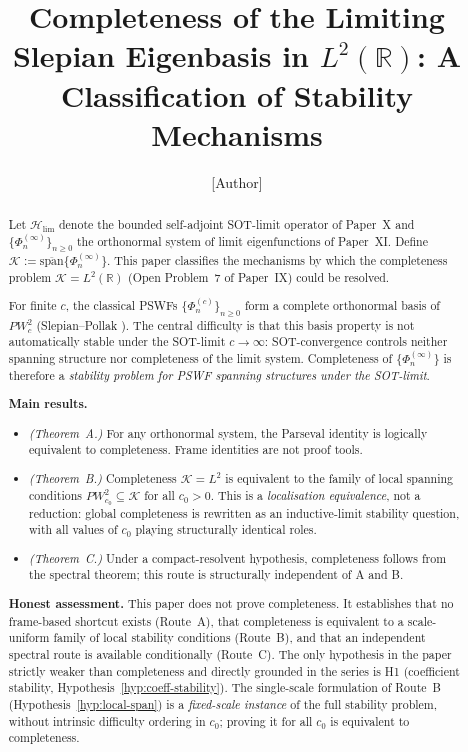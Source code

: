 \documentclass[12pt,a4paper]{amsart}
\theoremstyle{definition}
\theoremstyle{remark}
\newcommand{\Hlim}{\mathcal{H}_{\lim}}
\newcommand{\Phiinf}[1]{\Phi_{#1}^{(\infty)}}
\newcommand{\Phic}[2]{\Phi_{#2}^{(#1)}}
\newcommand{\PW}{PW}
\newcommand{\Kspace}{\mathcal{K}}
\begin{document}
\title[Completeness of the Limiting Slepian Eigenbasis]{%
  Completeness of the Limiting Slepian Eigenbasis in $L^2(\mathbb{R})$:
  A Classification of Stability Mechanisms}

\author{[Author]}
\address{[Address]}
\email{[Email]}

\begin{abstract}
Let $\Hlim$ denote the bounded self-adjoint SOT-limit operator
of Paper~X and $\{\Phiinf{n}\}_{n \ge 0}$ the orthonormal
system of limit eigenfunctions of Paper~XI.
Define $\Kspace := \overline{\mathrm{span}}\{\Phiinf{n}\}$.
This paper classifies the mechanisms by which the completeness
problem $\Kspace = L^2(\mathbb{R})$ (Open Problem~7 of Paper~IX)
could be resolved.

\medskip
For finite $c$, the classical PSWFs $\{\Phic{c}{n}\}_{n \ge 0}$
form a complete orthonormal basis of $\PW_c^2$ (Slepian--Pollak
\cite{Slepian1961}).
The central difficulty is that this basis property is not
automatically stable under the SOT-limit $c \to \infty$:
SOT-convergence controls neither spanning structure nor
completeness of the limit system.
Completeness of $\{\Phiinf{n}\}$ is therefore a
\emph{stability problem for PSWF spanning structures under
the SOT-limit}.

\medskip
\textbf{Main results.}
\begin{itemize}
\item \emph{(Theorem~A.)} For any orthonormal system,
  the Parseval identity is logically equivalent to completeness.
  Frame identities are not proof tools.
\item \emph{(Theorem~B.)} Completeness $\Kspace=L^2$ is equivalent
  to the family of local spanning conditions
  $\PW_{c_0}^2 \subseteq \Kspace$ for all $c_0>0$.
  This is a \emph{localisation equivalence}, not a reduction:
  global completeness is rewritten as an
  inductive-limit stability question, with all
  values of $c_0$ playing structurally identical roles.
\item \emph{(Theorem~C.)} Under a compact-resolvent
  hypothesis, completeness follows from the spectral theorem;
  this route is structurally independent of A and B.
\end{itemize}

\medskip
\textbf{Honest assessment.}
This paper does not prove completeness.
It establishes that no frame-based shortcut exists (Route~A),
that completeness is equivalent to a scale-uniform
family of local stability conditions (Route~B),
and that an independent spectral route is available
conditionally (Route~C).
The only hypothesis in the paper strictly weaker than
completeness and directly grounded in the series
is H1 (coefficient stability,
Hypothesis~\ref{hyp:coeff-stability}).
The single-scale formulation of Route~B
(Hypothesis~\ref{hyp:local-span}) is a
\emph{fixed-scale instance} of the full stability problem,
without intrinsic difficulty ordering in $c_0$;
proving it for all $c_0$ is equivalent to completeness.
\end{abstract}
\end{document}
